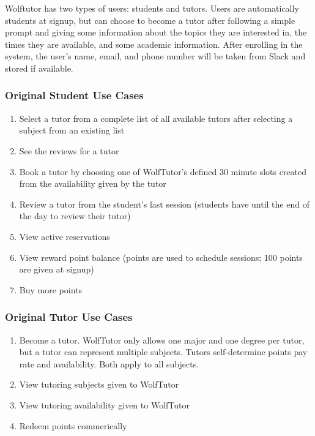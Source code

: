 Wolftutor has two types of users: students and tutors. Users are automatically
students at signup, but can choose to become a tutor after following a simple
prompt and giving some information about the topics they are interested in, the
times they are available, and some academic information. After enrolling in the
system, the user's name, email, and phone number will be taken from Slack and
stored if available.

\subsubsection{Original Student Use Cases}
\label{sec:student-use-cases}

\begin{enumerate}
  \item Select a tutor from a complete list of all available tutors after
  selecting a subject from an existing list
  \item See the reviews for a tutor
  \item Book a tutor by choosing one of WolfTutor's defined 30 minute slots
  created from the availability given by the tutor
  \item Review a tutor from the student's last session (students have until the end of the
  day to review their tutor)
  \item View active reservations
  \item View reward point balance (points are used to schedule sessions; 100
  points are given at signup)
  \item Buy more points
\end{enumerate}

\subsubsection{Original Tutor Use Cases}
\label{sec:tutor-use-cases}

\begin{enumerate}
  \item Become a tutor. WolfTutor only allows one major and one degree per tutor, 
  but a tutor can represent multiple subjects. Tutors self-determine points pay rate and availability. 
  Both apply to all subjects.
  \item View tutoring subjects given to WolfTutor
  \item View tutoring availability given to WolfTutor
  \item Redeem points commerically
\end{enumerate}
